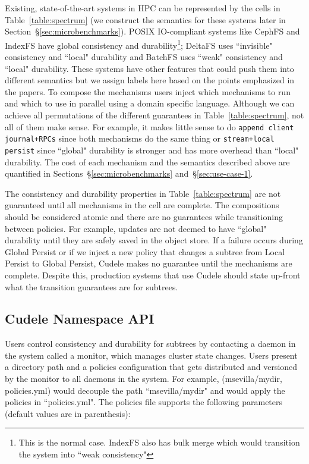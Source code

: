 Existing, state-of-the-art systems in HPC can be represented by the cells in
Table~\ref{table:spectrum} (we construct the semantics for these systems later
in Section~\S\ref{sec:microbenchmarks}).  POSIX IO-compliant systems like
CephFS and IndexFS have global consistency and durability\footnote{This is the
normal case.  IndexFS also has bulk merge which would transition the system
into ``weak consistency"}; DeltaFS uses ``invisible" consistency and ``local"
durability and BatchFS uses ``weak" consistency and ``local" durability. These
systems have other features that could push them into different semantics but
we assign labels here based on the points emphasized in the papers.  To compose
the mechanisms users inject which mechanisms to run and which to use in
parallel using a domain specific language.  Although we can achieve all
permutations of the different guarantees in Table~\ref{table:spectrum}, not all
of them make sense. For example, it makes little sense to do \texttt{append
client journal+RPCs} since both mechanisms do the same thing or
\texttt{stream+local persist} since ``global" durability is stronger and has more
overhead than ``local" durability. The cost of each mechanism and the semantics
described above are quantified in Sections~\S\ref{sec:microbenchmarks}
and~\S\ref{sec:use-case-1}.

The consistency and durability properties in Table~\ref{table:spectrum} are not
guaranteed until all mechanisms in the cell are complete. The compositions
should be considered atomic and there are no guarantees while transitioning
between policies. For example, updates are not deemed to have ``global"
durability until they are safely saved in the object store. If a failure occurs
during Global Persist or if we inject a new policy that changes a subtree from
Local Persist to Global Persist, Cudele makes no guarantee until the mechanisms
are complete. Despite this, production systems that use Cudele should state
up-front what the transition guarantees are for subtrees.

\subsection{Cudele Namespace API}
\label{sec:cudelefs-namespace-api}

Users control consistency and durability for subtrees by contacting a daemon in
the system called a monitor, which manages cluster state changes.  Users
present a directory path and a policies configuration that gets distributed and
versioned by the monitor to all daemons in the system. For example,
(msevilla/mydir, policies.yml) would decouple the path ``msevilla/mydir" and
would apply the policies in ``policies.yml".  The policies file supports the
following parameters (default values are in parenthesis):

